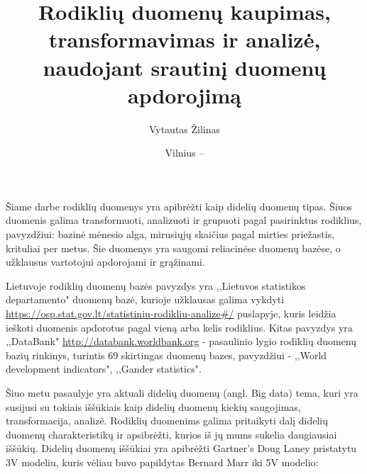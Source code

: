 \documentclass{VUMIFPSkursinis}
\title{Rodiklių duomenų kaupimas, transformavimas ir analizė, naudojant srautinį duomenų apdorojimą}
\author{Vytautas Žilinas}
\date{Vilnius – \the\year}
\begin{document}
	
\maketitle
\cleardoublepage{}
\setcounter{page}{2}

\tableofcontents


    Šiame darbe rodiklių duomenys yra apibrėžti kaip didelių duomenų tipas. Šiuos duomenis galima transformuoti, analizuoti ir grupuoti pagal pasirinktus rodiklius, 
pavyzdžiui: bazinė mėnesio alga, mirusiųjų skaičius pagal mirties priežastis, krituliai per metus. Šie duomenys yra saugomi reliacinėse duomenų bazėse,
o užklausus vartotojui apdorojami ir grąžinami.\par
Lietuvoje rodiklių duomenų bazės pavyzdys yra ,,Lietuvos statistikos departamento" duomenų bazė, kurioje užklausas galima vykdyti
\url{https://osp.stat.gov.lt/statistiniu-rodikliu-analize#/} puslapyje, kuris leidžia ieškoti duomenis apdorotus pagal vieną arba kelis rodiklius. 
Kitas pavyzdys yra ,,DataBank" \url{http://databank.worldbank.org} - pasaulinio lygio rodiklių duomenų bazių rinkinys, turintis 69 skirtingas 
duomenų bazes, pavyzdžiui - ,,World development indicators", ,,Gander statistics"\cite{databank-stats}. \par
Šiuo metu pasaulyje yra aktuali didelių duomenų (angl. Big data) tema, kuri yra susijusi su tokiais iššūkiais kaip didelių duomenų kiekių saugojimas, 
transformacija, analizė. Rodiklių duomenims galima pritaikyti dalį didelių duomenų charakteristikų 
ir apsibrėžti, kurios iš jų mums sukelia daugiausiai iššūkių. Didelių duomenų iššūkiai yra apibrėžti Gartner's Doug Laney pristatytu 3V modeliu\cite{laney20013d},
kuris vėliau buvo papildytas Bernard Marr iki 5V modelio\cite{marr2014big}:
\end{document}
